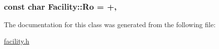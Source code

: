 \subsubsection[{\texorpdfstring{Ro}{Ro}}]{\setlength{\rightskip}{0pt plus 5cm}const char Facility\+::\+Ro = \textquotesingle{}+\textquotesingle{}\hspace{0.3cm}{\ttfamily [static]}, {\ttfamily [protected]}}\hypertarget{classFacility_ac6279190b255cdb87040af59e849543a}{}\label{classFacility_ac6279190b255cdb87040af59e849543a}


The documentation for this class was generated from the following file\+:\begin{DoxyCompactItemize}
\item 
\hyperlink{facility_8h}{facility.\+h}\end{DoxyCompactItemize}
